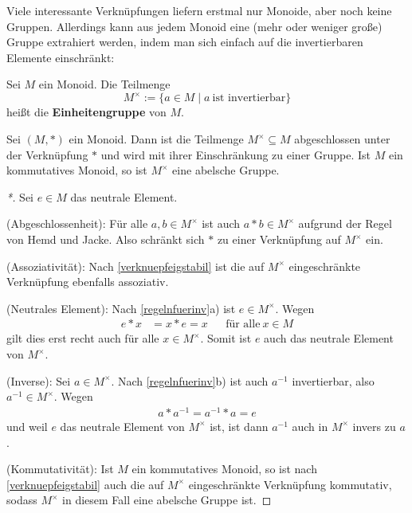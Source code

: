 Viele interessante Verknüpfungen liefern erstmal nur Monoide, aber noch keine Gruppen. Allerdings kann aus jedem Monoid eine (mehr oder weniger große) Gruppe extrahiert werden, indem man sich einfach auf die invertierbaren Elemente einschränkt:


\begin{defin} 
    Sei $M$ ein Monoid. Die Teilmenge
        \[ M^\times := \{a\in M\mid a\ \text{ist invertierbar} \} \]
    heißt die \textbf{Einheitengruppe} von $M$.
\end{defin}


\begin{satz} \label{einheitengruppe}
    Sei $(M,*)$ ein Monoid. Dann ist die Teilmenge $M^\times\subseteq M$ abgeschlossen unter der Verknüpfung $*$ und wird mit ihrer Einschränkung zu einer Gruppe. Ist $M$ ein kommutatives Monoid, so ist $M^\times$ eine abelsche Gruppe.
\end{satz}
\begin{proof}[*]
    Sei $e\in M$ das neutrale Element.

    (Abgeschlossenheit): Für alle $a,b\in M^\times$ ist auch $a*b\in M^\times$ aufgrund der Regel von Hemd und Jacke. Also schränkt sich $*$ zu einer Verknüpfung auf $M^\times$ ein.

    (Assoziativität): Nach \cref{verknuepfeigstabil} ist die auf $M^\times$ eingeschränkte Verknüpfung ebenfalls assoziativ.

    (Neutrales Element): Nach \cref{regelnfuerinv}a) ist $e\in M^\times$. Wegen
    \begin{align*}
        e*x& =x*e=x && \text{für alle}\ x\in M
    \end{align*}
    gilt dies erst recht auch für alle $x\in M^\times$. Somit ist $e$ auch das neutrale Element von $M^\times$.

    (Inverse): Sei $a\in M^\times$. Nach \cref{regelnfuerinv}b) ist auch $a^{-1}$ invertierbar, also $a^{-1}\in M^\times$. Wegen
    \begin{align*}
        a*a^{-1}=a^{-1}*a=e
    \end{align*}
    und weil $e$ das neutrale Element von $M^\times$ ist, ist dann $a^{-1}$ auch in $M^\times$ invers zu $a$.

    (Kommutativität): Ist $M$ ein kommutatives Monoid, so ist nach \cref{verknuepfeigstabil} auch die auf $M^\times$ eingeschränkte Verknüpfung kommutativ, sodass $M^\times$ in diesem Fall eine abelsche Gruppe ist.
\end{proof}


